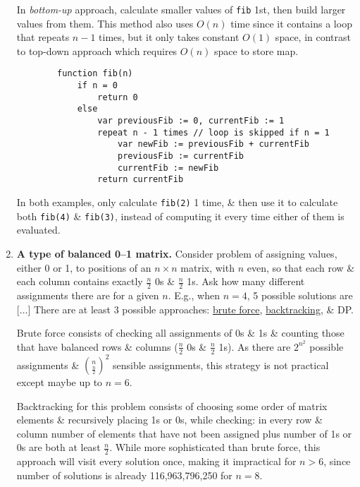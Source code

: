 \documentclass{article}
\begin{document}
\begin{enumerate}
	In {\it bottom-up} approach, calculate smaller values of {\tt fib} 1st, then build larger values from them. This method also uses $O(n)$ time since it contains a loop that repeats $n - 1$ times, but it only takes constant $O(1)$ space, in contrast to top-down approach which requires $O(n)$ space to store map.
	\begin{verbatim}
		function fib(n)
		    if n = 0
		        return 0
		    else
		        var previousFib := 0, currentFib := 1
		        repeat n - 1 times // loop is skipped if n = 1
		            var newFib := previousFib + currentFib
		            previousFib := currentFib
		            currentFib := newFib
		        return currentFib
	\end{verbatim}
	In both examples, only calculate {\tt fib(2)} 1 time, \& then use it to calculate both {\tt fib(4)} \& {\tt fib(3)}, instead of computing it every time either of them is evaluated.
	\item {\bf A type of balanced 0--1 matrix.} Consider problem of assigning values, either 0 or 1, to positions of an $n\times n$ matrix, with $n$ even, so that each row \& each column contains exactly $\frac{n}{2}$ 0s \& $\frac{n}{2}$ 1s. Ask how many different assignments there are for a given $n$. E.g., when $n = 4$, 5 possible solutions are [$\ldots$] There are at least 3 possible approaches: \href{https://en.wikipedia.org/wiki/Brute-force_search}{brute force}, \href{https://en.wikipedia.org/wiki/Backtracking}{backtracking}, \& DP.

	Brute force consists of checking all assignments of 0s \& 1s \& counting those that have balanced rows \& columns ($\frac{n}{2}$ 0s \& $\frac{n}{2}$ 1s). As there are $2^{n^2}$ possible assignments \& $\binom{n}{\frac{n}{2}}^2$ sensible assignments, this strategy is not practical except maybe up to $n = 6$.

	Backtracking for this problem consists of choosing some order of matrix elements \& recursively placing 1s or 0s, while checking: in every row \& column number of elements that have not been assigned plus number of 1s or 0s are both at least $\frac{n}{2}$. While more sophisticated than brute force, this approach will visit every solution once, making it impractical for $n > 6$, since number of solutions is already 116,963,796,250 for $n = 8$.


\end{enumerate}
\end{document}
